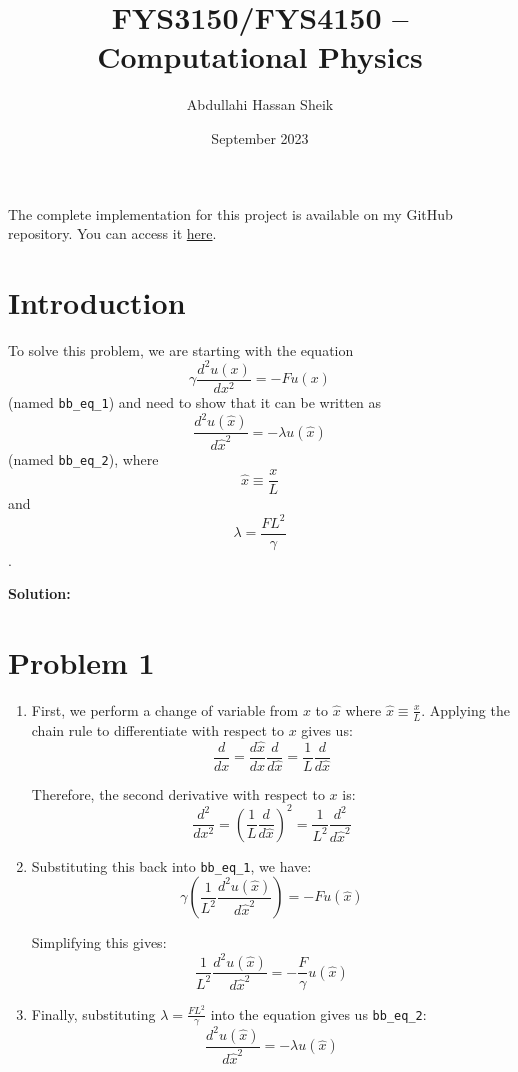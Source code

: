 \documentclass{article}
\title{FYS3150/FYS4150 – Computational Physics}
\author{Abdullahi Hassan Sheik }
\date{September 2023}
\begin{document}
\maketitle

\paragraph{}
The complete implementation for this project is available on my GitHub repository. You can access it \href{https://github.com/SheikAbdullahi/FYS4150Computational-Physics}{here}.

\section{Introduction}

To solve this problem, we are starting with the equation 
\[ \gamma \frac{d^2 u(x)}{dx^2} = - F u(x) \] 
(named \texttt{bb\_eq\_1}) and need to show that it can be written as 
\[ \frac{d^2 u(\hat{x})}{d\hat{x}^2} = - \lambda u(\hat{x}) \] 
(named \texttt{bb\_eq\_2}), where 
\[ \hat{x} \equiv \frac{x}{L} \] 
and 
\[ \lambda = \frac{F L^2}{\gamma} \].

\textbf{Solution:}

\section*{Problem 1}
\begin{enumerate}
    \item First, we perform a change of variable from $x$ to $\hat{x}$ where $\hat{x} \equiv \frac{x}{L}$. Applying the chain rule to differentiate with respect to $x$ gives us:
    \[ \frac{d}{dx} = \frac{d\hat{x}}{dx} \frac{d}{d\hat{x}} = \frac{1}{L} \frac{d}{d\hat{x}} \]
    
    Therefore, the second derivative with respect to $x$ is:
    \[ \frac{d^2}{dx^2} = \left( \frac{1}{L} \frac{d}{d\hat{x}} \right)^2 = \frac{1}{L^2} \frac{d^2}{d\hat{x}^2} \]
    
    \item Substituting this back into \texttt{bb\_eq\_1}, we have:
    \[ \gamma \left( \frac{1}{L^2} \frac{d^2 u(\hat{x})}{d\hat{x}^2} \right) = - F u(\hat{x}) \]
    
    Simplifying this gives:
    \[ \frac{1}{L^2} \frac{d^2 u(\hat{x})}{d\hat{x}^2} = - \frac{F}{\gamma} u(\hat{x}) \]
    
    \item Finally, substituting $\lambda = \frac{F L^2}{\gamma}$ into the equation gives us \texttt{bb\_eq\_2}:
    \[ \frac{d^2 u(\hat{x})}{d\hat{x}^2} = - \lambda u(\hat{x}) \]
\end{enumerate}
\end{document}
